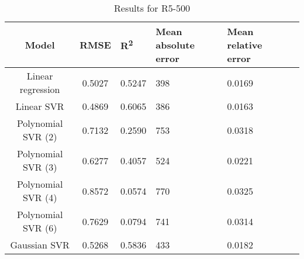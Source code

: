 \begin{table}[H]
\centering
\begin{adjustbox}{center}
\begin{tabular}{c | c M{1.2cm} M{2.5cm} M{2.5cm} M{1.8cm}}
Model & RMSE & R\textsuperscript{2} & Mean absolute error & Mean relative error \tabularnewline
\hline
Linear regression & 0.5027 & 0.5247 &    398 & 0.0169 \\
Linear SVR & 0.4869 & 0.6065 &    386 & 0.0163 \\
Polynomial SVR (2) & 0.7132 & 0.2590 &    753 & 0.0318 \\
Polynomial SVR (3) & 0.6277 & 0.4057 &    524 & 0.0221 \\
Polynomial SVR (4) & 0.8572 & 0.0574 &    770 & 0.0325 \\
Polynomial SVR (6) & 0.7629 & 0.0794 &    741 & 0.0314 \\
Gaussian SVR & 0.5268 & 0.5836 &    433 & 0.0182 \\
\end{tabular}
\end{adjustbox}
\\
\caption{Results for R5-500}
\label{tab:coreonly_linear_R5_500}
\end{table}
